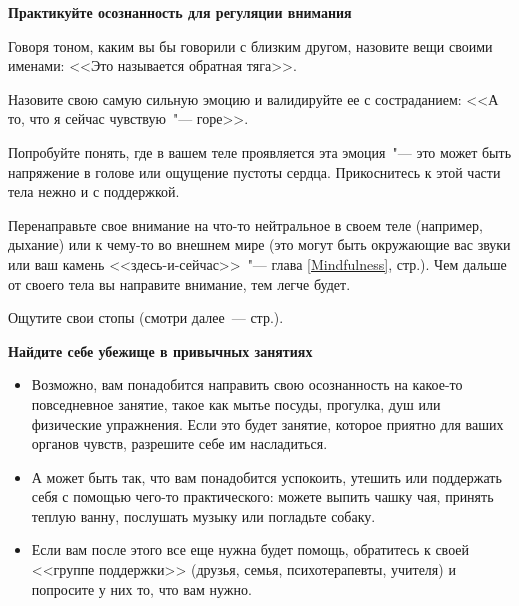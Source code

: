 \textbf{Практикуйте осознанность для регуляции внимания}
\begin{itemize}
	\itemdiamondsuit Говоря тоном, каким вы бы говорили с близким другом, назовите вещи своими именами: <<Это называется обратная тяга>>.
	
	\itemdiamondsuit Назовите свою самую сильную эмоцию и валидируйте ее с состраданием: <<А то, что я сейчас чувствую~"--- горе>>.
	
	\itemdiamondsuit Попробуйте понять, где в вашем теле проявляется эта эмоция~"--- это может быть напряжение в голове или ощущение пустоты сердца. Прикоснитесь к этой части тела нежно и с поддержкой.
	
	\itemdiamondsuit Перенаправьте свое внимание на что-то нейтральное в своем теле (например, дыхание) или к чему-то во внешнем мире (это могут быть окружающие вас звуки или ваш камень <<здесь-и-сейчас>>~"--- глава \ref{Mindfulness}, стр.\:\pageref{IP:Here-and-now_stone}). Чем дальше от своего тела вы направите внимание, тем легче будет.
	
	\itemdiamondsuit Ощутите свои стопы (смотри далее~--- стр.\:\pageref{IP:Feeling_the_Soles_of_Your_Feet}).
\end{itemize}

\vspace{2ex}

\textbf{Найдите себе убежище в привычных занятиях}
\begin{itemize}
	\item Возможно, вам понадобится направить свою осознанность на какое-то повседневное занятие, такое как мытье посуды, прогулка, душ или физические упражнения. Если это будет занятие, которое приятно для ваших органов чувств, разрешите себе им насладиться.

	\item А может быть так, что вам понадобится успокоить, утешить или поддержать себя с помощью чего-то практического: можете выпить чашку чая, принять теплую ванну, послушать музыку или погладьте собаку.

	\item Если вам после этого все еще нужна будет помощь, обратитесь к своей <<группе поддержки>> (друзья, семья, психотерапевты, учителя) и попросите у них то, что вам нужно.
\end{itemize}


